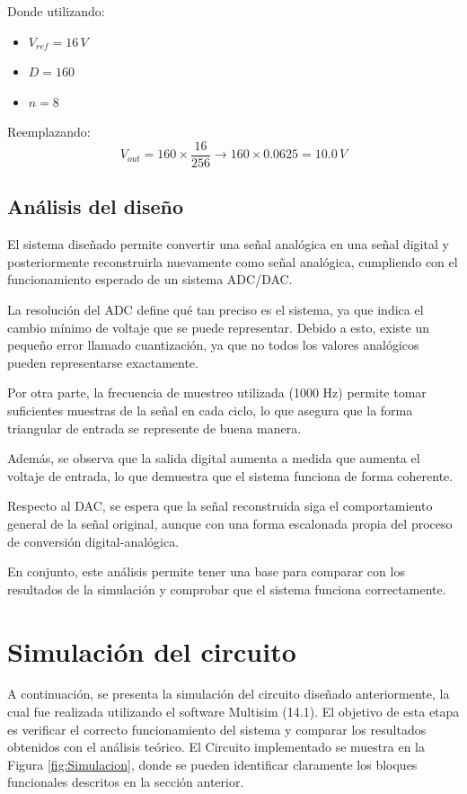 \documentclass[12pt,letterpaper]{article}
\begin{document}
    Donde utilizando:
    \begin{itemize}
        \item $V_{ref} = 16 \, V$
        \item $D = 160$
        \item $n = 8$
    \end{itemize}

    Reemplazando:
    \[
        V_{out} = 160 \times \frac{16}{256} \rightarrow 160 \times 0.0625 =  10.0 \, V
    \]

    \subsection{Análisis del diseño}

    El sistema diseñado permite convertir una señal analógica en una señal digital y posteriormente reconstruirla nuevamente como señal analógica, cumpliendo con el funcionamiento esperado de un sistema ADC/DAC.
    
    La resolución del ADC define qué tan preciso es el sistema, ya que indica el cambio mínimo de voltaje que se puede representar. Debido a esto, existe un pequeño error llamado cuantización, ya que no todos los valores analógicos pueden representarse exactamente.
    
    Por otra parte, la frecuencia de muestreo utilizada (1000 Hz) permite tomar suficientes muestras de la señal en cada ciclo, lo que asegura que la forma triangular de entrada se represente de buena manera.
    
    Además, se observa que la salida digital aumenta a medida que aumenta el voltaje de entrada, lo que demuestra que el sistema funciona de forma coherente.
    
    Respecto al DAC, se espera que la señal reconstruida siga el comportamiento general de la señal original, aunque con una forma escalonada propia del proceso de conversión digital-analógica.
    
    En conjunto, este análisis permite tener una base para comparar con los resultados de la simulación y comprobar que el sistema funciona correctamente.



    \newpage

    \section{Simulación del circuito}

    A continuación, se presenta la simulación del circuito diseñado anteriormente, la cual fue realizada utilizando el software Multisim (14.1). El objetivo de esta etapa es verificar el correcto funcionamiento del sistema y comparar los resultados obtenidos con el análisis teórico. El Circuito implementado se muestra en la Figura \ref{fig:Simulacion}, donde se pueden identificar claramente los bloques funcionales descritos en la sección anterior.
\end{document}
